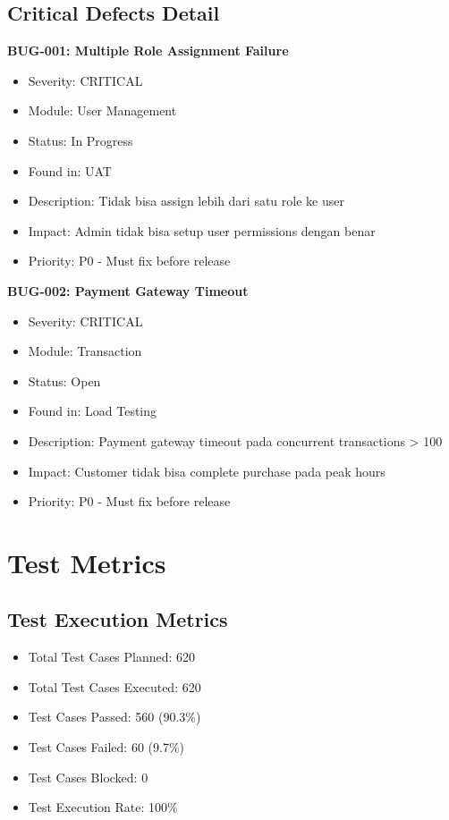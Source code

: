 \documentclass[12pt,a4paper]{article}
\begin{document}
\subsection{Critical Defects Detail}
\textbf{BUG-001: Multiple Role Assignment Failure}
\begin{itemize}
  \item Severity: CRITICAL
  \item Module: User Management
  \item Status: In Progress
  \item Found in: UAT
  \item Description: Tidak bisa assign lebih dari satu role ke user
  \item Impact: Admin tidak bisa setup user permissions dengan benar
  \item Priority: P0 - Must fix before release
\end{itemize}

\textbf{BUG-002: Payment Gateway Timeout}
\begin{itemize}
  \item Severity: CRITICAL
  \item Module: Transaction
  \item Status: Open
  \item Found in: Load Testing
  \item Description: Payment gateway timeout pada concurrent transactions > 100
  \item Impact: Customer tidak bisa complete purchase pada peak hours
  \item Priority: P0 - Must fix before release
\end{itemize}

\section{Test Metrics}
\subsection{Test Execution Metrics}
\begin{itemize}
  \item Total Test Cases Planned: 620
  \item Total Test Cases Executed: 620
  \item Test Cases Passed: 560 (90.3\%)
  \item Test Cases Failed: 60 (9.7\%)
  \item Test Cases Blocked: 0
  \item Test Execution Rate: 100\%
\end{itemize}
\end{document}
